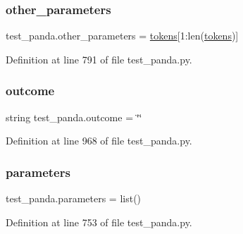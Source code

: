 \subsubsection{\texorpdfstring{other\+\_\+parameters}{other\_parameters}}
{\footnotesize\ttfamily test\+\_\+panda.\+other\+\_\+parameters = \hyperlink{namespacetest__panda_a2d26dd74cc87c155c90e49e45383a469}{tokens}\mbox{[}1\+:len(\hyperlink{namespacetest__panda_a2d26dd74cc87c155c90e49e45383a469}{tokens})\mbox{]}}



Definition at line 791 of file test\+\_\+panda.\+py.

\mbox{\label{namespacetest__panda_a39a6d10997e19157bd01ab927a81c044}} 
\subsubsection{\texorpdfstring{outcome}{outcome}}
{\footnotesize\ttfamily string test\+\_\+panda.\+outcome = \char`\"{}\char`\"{}}



Definition at line 968 of file test\+\_\+panda.\+py.

\mbox{\label{namespacetest__panda_ab9df5b55d8be6db30f3b8e8cbf2eb6c4}} 
\subsubsection{\texorpdfstring{parameters}{parameters}}
{\footnotesize\ttfamily test\+\_\+panda.\+parameters = list()}



Definition at line 753 of file test\+\_\+panda.\+py.



